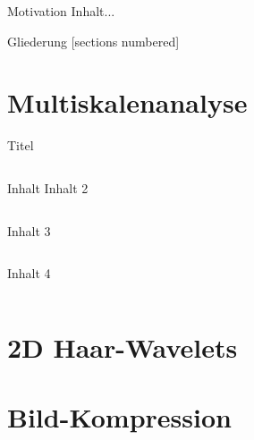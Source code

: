 \begin{frame}{Motivation}
	Inhalt...
\end{frame}

\begin{frame}{Gliederung}
	[sections numbered]
	\tableofcontents[hideallsubsections]
\end{frame}

\section[Multiskalenanalyse \hspace{42mm}\small am Beispiel der eindimensionalen Haar-Wavelets]{Multiskalenanalyse}
	
	{
	\begin{frame}{Titel}
		\begin{columns}[T,onlytextwidth]
			Inhalt
			Inhalt 2
		\end{columns}
		Inhalt 3 \pause
		\begin{columns}[c,onlytextwidth]
			\centering
			Inhalt 4
			
			\vspace{15pt}\ \\
		\end{columns}
	\end{frame}}


\section{2D Haar-Wavelets}


\section{Bild-Kompression}